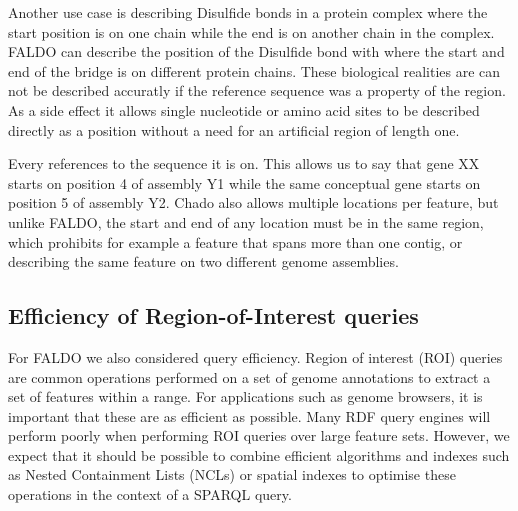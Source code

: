 Another use case is describing Disulfide bonds in a protein complex where the start position is on one chain while the end is on another chain in the complex. FALDO can describe the position of the Disulfide bond with  where the start and end of the bridge is on different protein chains.
These biological realities are can not be described accuratly if the reference sequence was a property of the region. 
As a side effect it allows single nucleotide or amino acid sites to be described directly as a position without a need for an artificial region of length one.

Every  references to the sequence it is on. This allows us to say that gene XX starts on position 4 of assembly Y1 while the same conceptual gene starts on position 5 of assembly Y2. Chado also allows multiple locations per feature, but unlike FALDO, the start and end of
any location must be in the same region, which prohibits for example a feature that spans more than one contig, or describing the same feature on two different genome assemblies.

\subsection*{Efficiency of Region-of-Interest queries}

For FALDO we also considered query efficiency. 
Region of interest (ROI) queries are common operations performed on a
set of genome annotations to extract a set of features within a
range. For applications such as genome browsers, it is important that
these are as efficient as possible. Many RDF query engines will
perform poorly when performing ROI queries over large feature
sets. However, we expect that it should be possible to combine
efficient algorithms and indexes such as Nested Containment Lists
(NCLs)\cite{NCL2007} or spatial indexes to optimise these operations
in the context of a SPARQL query.



